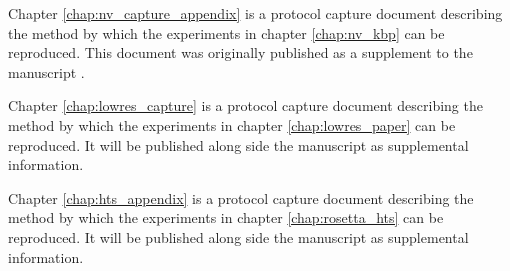 Chapter \ref{chap:nv_capture_appendix} is a protocol capture document describing the method by which the experiments in chapter \ref{chap:nv_kbp} can be reproduced.
This document was originally published as a supplement to the manuscript \citep{DeLuca:2011gg}.

Chapter \ref{chap:lowres_capture} is a protocol capture document describing the method by which the experiments in chapter \ref{chap:lowres_paper} can be reproduced.
It will be published along side the manuscript as supplemental information.

Chapter \ref{chap:hts_appendix} is a protocol capture document describing the method by which the experiments in chapter \ref{chap:rosetta_hts} can be reproduced.
It will be published along side the manuscript as supplemental information.